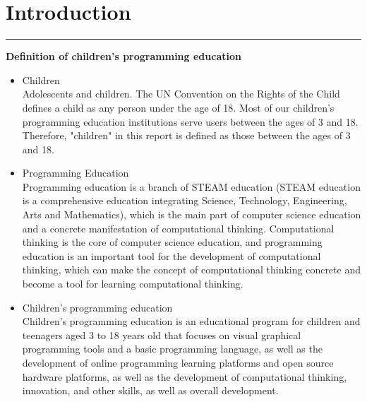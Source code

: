 \documentclass[12pt]{extarticle}
\numberwithin{figure}{section}
\begin{document}
\section{Introduction}
\vspace{-0.1cm}
\hrule
\vspace{0.2cm}
\textbf{Definition of children's programming education}
\begin{itemize}
    \setlength{\itemsep}{0pt}
          \setlength{\parsep}{0pt}
          \setlength{\parskip}{0pt}
    \item {\normalsize Children}\\
          Adolescents and children. The UN Convention on the Rights of the Child defines a child as any person under the age of 18. Most of our children's programming education institutions serve users between the ages of 3 and 18. Therefore, "children" in this report is defined as those between the ages of 3 and 18.
    \item {\normalsize Programming Education}\\
          Programming education is a branch of STEAM education (STEAM education is a comprehensive education integrating Science, Technology, Engineering, Arts and Mathematics), which is the main part of computer science education and a concrete manifestation of computational thinking. Computational thinking is the core of computer science education, and programming education is an important tool for the development of computational thinking, which can make the concept of computational thinking concrete and become a tool for learning computational thinking.
    \item {\normalsize Children's programming education}\\
          Children's programming education is an educational program for children and teenagers aged 3 to 18 years old that focuses on visual graphical programming tools and a basic programming language, as well as the development of online programming learning platforms and open source hardware platforms, as well as the development of computational thinking, innovation, and other skills, as well as overall development.
\end{itemize}
\end{document}
